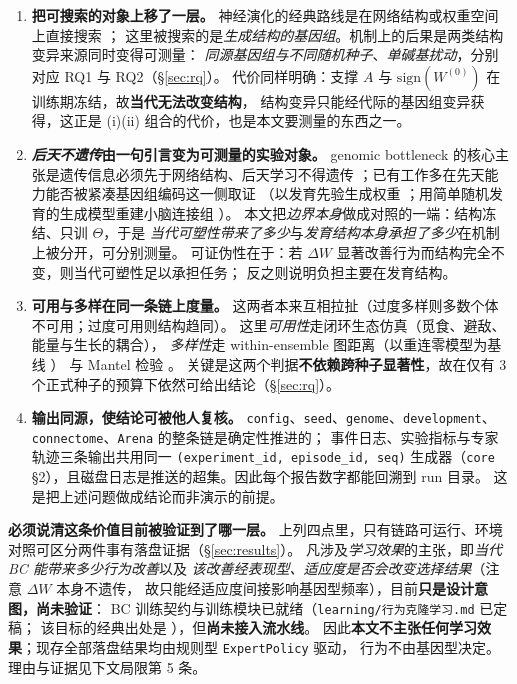 \begin{enumerate}
  \item \textbf{把可搜索的对象上移了一层。}
  神经演化的经典路线是在网络结构或权重空间上直接搜索 \citep{bib5_miikkulainen2025}；
  这里被搜索的是\emph{生成结构的基因组}。机制上的后果是两类结构变异来源同时变得可测量：
  \emph{同源基因组与不同随机种子}、\emph{单碱基扰动}，分别对应 RQ1 与 RQ2（\S\ref{sec:rq}）。
  代价同样明确：支撑 $A$ 与 $\mathrm{sign}(W^{(0)})$ 在训练期冻结，故\textbf{当代无法改变结构}，
  结构变异只能经代际的基因组变异获得，这正是 (i)(ii) 组合的代价，也是本文要测量的东西之一。

  \item \textbf{\emph{后天不遗传}由一句引言变为可测量的实验对象。}
  genomic bottleneck 的核心主张是遗传信息必须先于网络结构、后天学习不得遗传
  \citep{bib1_zador2019,bib3_shuvaev2024}；已有工作多在先天能力能否被紧凑基因组编码这一侧取证
  （以发育先验生成权重 \citep{bib2_barabasi2023}；用简单随机发育的生成模型重建小脑连接组 \citep{bib4_richter2025}）。
  本文把\emph{边界本身}做成对照的一端：结构冻结、只训 $\Theta$，于是
  \emph{当代可塑性带来了多少}与\emph{发育结构本身承担了多少}在机制上被分开，可分别测量。
  可证伪性在于：若 $\Delta W$ 显著改善行为而结构完全不变，则当代可塑性足以承担任务；
  反之则说明负担主要在发育结构。

  \item \textbf{可用与多样在同一条链上度量。}
  这两者本来互相拉扯（过度多样则多数个体不可用；过度可用则结构趋同）。
  这里\emph{可用性}走闭环生态仿真（觅食、避敌、能量与生长的耦合），
  \emph{多样性}走 within-ensemble 图距离（以重连零模型为基线 \citep{bib20_hartle2020}）
  与 Mantel 检验 \citep{bib21_smouse1986}。
  关键是这两个判据\textbf{不依赖跨种子显著性}，故在仅有 3 个正式种子的预算下依然可给出结论（\S\ref{sec:rq}）。

  \item \textbf{输出同源，使结论可被他人复核。}
  \texttt{config}、\texttt{seed}、\texttt{genome}、\texttt{development}、\texttt{connectome}、\texttt{Arena} 的整条链是确定性推进的；
  事件日志、实验指标与专家轨迹三条输出共用同一 \texttt{(experiment\_id, episode\_id, seq)}
  生成器（\texttt{core} \S2），且磁盘日志是推送的超集。因此每个报告数字都能回溯到 run 目录。
  这是把上述问题做成结论而非演示的前提。
\end{enumerate}

\textbf{必须说清这条价值目前被验证到了哪一层。}
上列四点里，只有链路可运行、环境对照可区分两件事有落盘证据（\S\ref{sec:results}）。
凡涉及\emph{学习效果}的主张，即\emph{当代 BC 能带来多少行为改善}以及
\emph{该改善经表现型、适应度是否会改变选择结果}（注意 $\Delta W$ 本身不遗传，
故只能经适应度间接影响基因型频率），目前\textbf{只是设计意图，尚未验证}：
BC 训练契约与训练模块已就绪（\texttt{learning/行为克隆学习.md} 已定稿；
该目标的经典出处是 \citep{bib209_pomerleau1991}），但\textbf{尚未接入流水线}。
因此\textbf{本文不主张任何学习效果}；现存全部落盘结果均由规则型 \texttt{ExpertPolicy} 驱动，
行为不由基因型决定。理由与证据见下文局限第 5 条。

